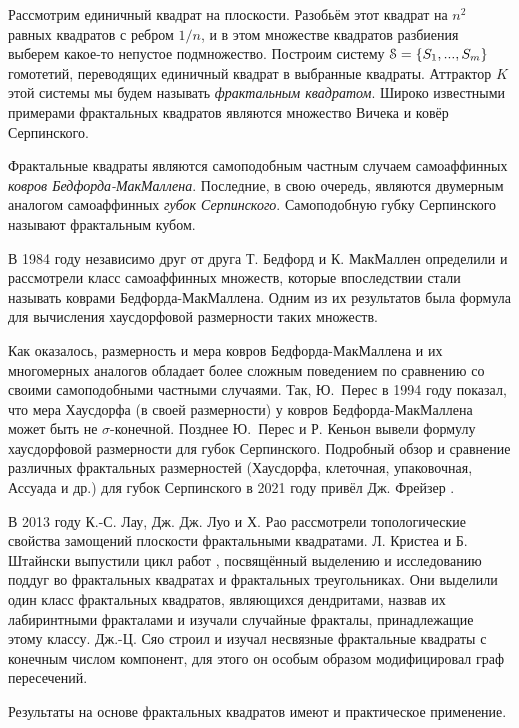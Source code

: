 Рассмотрим единичный квадрат на плоскости.
Разобьём этот квадрат на $n^2$ равных квадратов с ребром $1/n$, и в этом множестве  квадратов  разбиения выберем какое-то непустое подмножество.
Построим систему ${\EuScript S}=\{S_1,...,S_m\}$  гомотетий, переводящих единичный квадрат в выбранные  квадраты. Аттрактор $K$ этой системы мы будем называть {\em фрактальным квадратом}.
 Широко известными примерами фрактальных квадратов являются множество Вичека и ковёр Серпинского.

Фрактальные квадраты являются самоподобным частным случаем самоаффинных {\em ковров Бедфорда-МакМаллена}. 
Последние, в свою очередь, являются двумерным аналогом самоаффинных {\em губок Серпинского}.
Самоподобную губку Серпинского называют фрактальным кубом.

В 1984 году независимо друг от друга Т. Бедфорд \cite{Bedford1984} и К. МакМаллен \cite{McMullen1984} определили и рассмотрели класс самоаффинных множеств, которые впоследствии стали называть коврами Бедфорда-МакМаллена.
Одним из их результатов была формула для вычисления хаусдорфовой размерности   таких множеств.

Как оказалось, размерность и мера ковров Бедфорда-МакМаллена и их многомерных аналогов обладает более сложным поведением по сравнению со своими самоподобными частными случаями.
Так, Ю.~Перес \cite{Peres1994} в 1994 году показал, что мера Хаусдорфа (в своей размерности) у ковров Бедфорда-МакМаллена может быть не $\sigma$-конечной.
Позднее Ю.~Перес и  Р. Кеньон \cite{KenyonPeres1996} вывели формулу хаусдорфовой размерности   для губок Серпинского.
Подробный обзор и сравнение различных фрактальных размерностей (Хаусдорфа, клеточная, упаковочная, Ассуада и др.) для губок Серпинского в 2021 году привёл Дж. Фрейзер \cite{Fraser_2021}.


В 2013 году К.-С. Лау, Дж. Дж. Луо и Х. Рао \cite{LLR2013} рассмотрели топологические свойства замощений плоскости фрактальными квадратами.
Л. Кристеа и Б. Штайнски выпустили цикл работ \cite{CS1,CS2,CS3}, посвящённый выделению и исследованию поддуг во фрактальных квадратах и фрактальных треугольниках.
Они выделили один класс фрактальных квадратов, являющихся дендритами, назвав их лабиринтными фракталами и изучали случайные фракталы, принадлежащие этому классу.
Дж.-Ц. Сяо \cite{Xiao2021} строил и изучал несвязные фрактальные квадраты с конечным числом компонент, для этого он особым образом модифицировал граф пересечений.

Результаты на основе фрактальных квадратов имеют и практическое применение.



